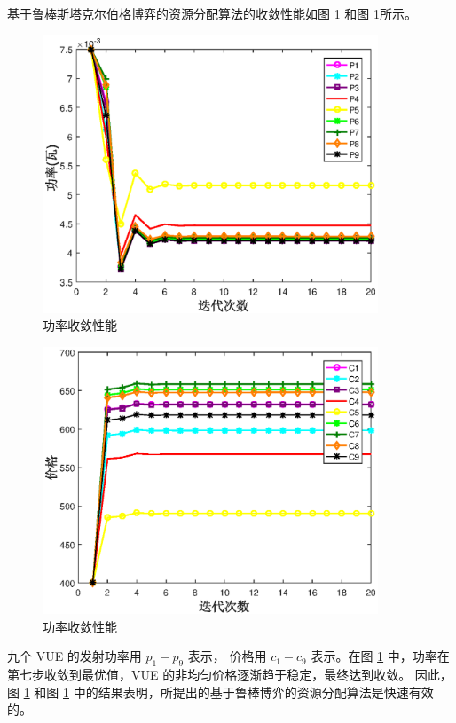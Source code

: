 基于鲁棒斯塔克尔伯格博弈的资源分配算法的收敛性能如图 \ref{功率收敛性能} 和图 \ref{功率收敛性能}所示。
\begin{figure}[H]
\centering
\includegraphics[width=10cm]{figures//chap2//功率.eps}
\caption{功率收敛性能}
\label{功率收敛性能}
\end{figure}
\begin{figure}[H]
\centering
\includegraphics[width=10cm]{figures//chap2//价格.eps}
\caption{功率收敛性能}
\label{价格收敛性能}
\end{figure}

九个 VUE 的发射功率用 $p_{1}-p_{9}$ 表示，
价格用 $c_{1}-c_{9}$ 表示。在图 \ref{功率收敛性能} 中，功率在第七步收敛到最优值，VUE 的非均匀价格逐渐趋于稳定，最终达到收敛。
因此，图 \ref{功率收敛性能} 和图 \ref{功率收敛性能} 中的结果表明，所提出的基于鲁棒博弈的资源分配算法是快速有效的。

